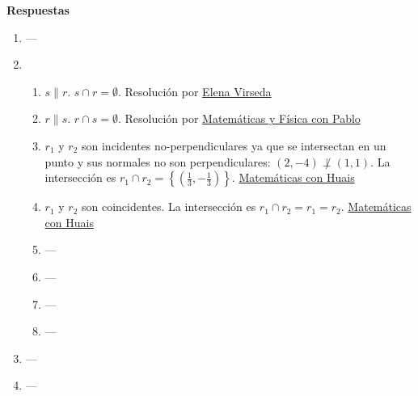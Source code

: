 \documentclass[a4paper]{article}
\newcommand{\exercise}{\item}
\begin{document}
 \textbf{Respuestas}\begin{enumerate}\exercise---\exercise\begin{enumerate} [label=(\alph*)]		\item $s \parallel r$. $s \cap r=\emptyset$.  Resolución por \href{https://youtu.be/cHsXMw3V4mQ}{Elena Virseda}
		\item $r \parallel s$. $r \cap s=\emptyset$. Resolución por \href{https://youtu.be/MPUh70MKVUY}{Matemáticas y Física con Pablo}
		\item $r_1$ y $r_2$ son incidentes no-perpendiculares ya que se intersectan en un punto y sus normales no son perpendiculares: $(2,-4) \not\perp (1,1)$. La intersección es $r_1 \cap r_2=\left\{ \left(\frac{1}{3},-\frac{1}{3}\right)\right\}$. \href{https://youtu.be/LgIU8pd8DeM?t=97}{Matemáticas con Huais}
		\item $r_1$ y $r_2$ son coincidentes. La intersección es $r_1 \cap r_2=r_1=r_2$. \href{https://youtu.be/LgIU8pd8DeM?t=884}{Matemáticas con Huais}
\item ---\item ---\item ---\item ---\end{enumerate}\exercise---\exercise---\end{enumerate}
\end{document}
